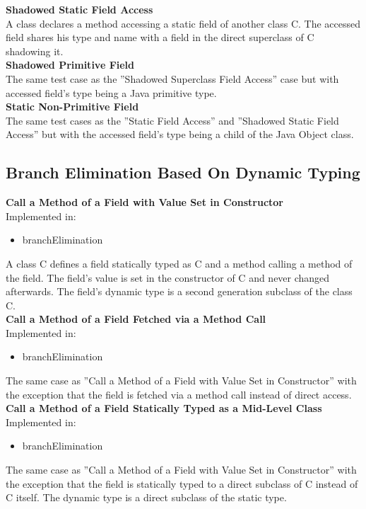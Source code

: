 \documentclass{article}
\begin{document}
\textbf{Shadowed Static Field Access}\\
A class declares a method accessing a static field of another class C. The accessed field shares his type and name with a field in the direct superclass of C shadowing it.\\

\noindent
\textbf{Shadowed Primitive Field}\\
The same test case as the ''Shadowed Superclass Field Access'' case but with accessed field's type being a Java primitive type.\\

\noindent
\textbf{Static Non-Primitive Field}\\
The same test cases as the ''Static Field Access'' and ''Shadowed Static Field Access'' but with the accessed field's type being a child of the Java Object class.\\


\subsection{Branch Elimination Based On Dynamic Typing}

\textbf{Call a Method of a Field with Value Set in Constructor}\\
Implemented in: 
\begin{itemize}
    \item branchElimination
\end{itemize}
A class C defines a field statically typed as C and a method calling a method of the field. The field's value is set in the constructor of C and never changed afterwards. The field's dynamic type is a second generation subclass of the class C.\\

\noindent
\textbf{Call a Method of a Field Fetched via a Method Call}\\
Implemented in: 
\begin{itemize}
    \item branchElimination
\end{itemize}
The same case as ''Call a Method of a Field with Value Set in Constructor'' with the exception that the field is fetched via a method call instead of direct access.\\

\noindent
\textbf{Call a Method of a Field Statically Typed as a Mid-Level Class}\\
Implemented in: 
\begin{itemize}
    \item branchElimination
\end{itemize}
The same case as ''Call a Method of a Field with Value Set in Constructor'' with the exception that the field is statically typed to a direct subclass of C instead of C itself. The dynamic type is a direct subclass of the static type.\\
\end{document}
